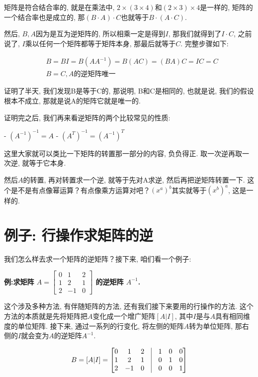 矩阵是符合结合率的, 就是在乘法中, $2\times (3 \times 4)$和$(2 \times 3) \times 4$是一样的, 矩阵的一个结合率也是成立的, 那$(B\cdot A) \cdot C$也就等于$B \cdot (A \cdot C)$. 

然后, $B, A$因为是互为逆矩阵的, 所以相乘一定是得到$I$, 那我们就得到了$I \cdot C$, 之前说了, $I$乘以任何一个矩阵都等于矩阵本身, 那最后就等于$C$. 完整步骤如下:

\begin{align*}
  & B = BI = B(AA^{-1}) = B(AC) = (BA)C = IC = C \\
  & B = C, A\mbox{的逆矩阵唯一}
\end{align*}

证明了半天, 我们发现B是等于C的, 那说明, B和C是相同的, 也就是说, 我们的假设根本不成立, 那就是说A的矩阵它就是唯一的. 

证明完之后, 我们再来看逆矩阵的两个比较常见的性质: 

- $(A^{-1})^{-1} = A$
- $(A^T)^{-1} = (A^{-1})^T$

这里大家就可以类比一下矩阵的转置那一部分的内容, 负负得正. 取一次逆再取一次逆, 就等于它本身. 

然后$A$的转置, 再对转置求一个逆, 就等于先对A求逆, 然后再把逆矩阵转置一下. 这个是不是有点像幂运算？有点像乘方运算对吧？$(x^a)^b$其实就等于$(x^b)^a$, 这是一样的. 

\section{例子: 行操作求矩阵的逆}

我们怎么样去求一个矩阵的逆矩阵？接下来, 咱们看一个例子: 

\textbf{例:求矩阵 $A = \begin{bmatrix} 0 & 1 & 2 \\  1 & 2 & 1 \\ 2 & -1 & 0 \end{bmatrix}$ 的逆矩阵 $A^{-1}$.}

这个涉及多种方法, 有伴随矩阵的方法, 还有我们接下来要用的行操作的方法. 这个方法的本质就是先将矩阵把$A$变化成一个增广矩阵$[A|I]$, 其中$I$是与$A$具有相同维度的单位矩阵. 接下来, 通过一系列的行变化, 将左侧的矩阵$A$转为单位矩阵, 那右侧的$I$就会变为$A$的逆矩阵$A^{-1}$.

\begin{align*}
  B = [A|I] =  
  \begin{bmatrix}
    0 & 1 & 2 & \vline & 1 & 0 & 0\\ 
    1 & 2 & 1 & \vline & 0 & 1 & 0 \\
    2 & -1 & 0 & \vline & 0 & 0 & 1
  \end{bmatrix}
\end{align*}

